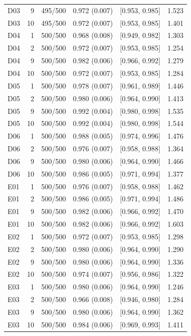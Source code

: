 \begin{longtable}[t]{lrllll}
D03 & 9 & 495/500 & 0.972 (0.007) & {}[0.953, 0.985] & 1.523\\
D03 & 10 & 495/500 & 0.972 (0.007) & {}[0.953, 0.985] & 1.401\\
D04 & 1 & 500/500 & 0.968 (0.008) & {}[0.949, 0.982] & 1.303\\
D04 & 2 & 500/500 & 0.972 (0.007) & {}[0.953, 0.985] & 1.254\\
D04 & 9 & 500/500 & 0.982 (0.006) & {}[0.966, 0.992] & 1.279\\
D04 & 10 & 500/500 & 0.972 (0.007) & {}[0.953, 0.985] & 1.284\\
D05 & 1 & 500/500 & 0.978 (0.007) & {}[0.961, 0.989] & 1.446\\
D05 & 2 & 500/500 & 0.980 (0.006) & {}[0.964, 0.990] & 1.413\\
D05 & 9 & 500/500 & 0.992 (0.004) & {}[0.980, 0.998] & 1.535\\
D05 & 10 & 500/500 & 0.992 (0.004) & {}[0.980, 0.998] & 1.544\\
D06 & 1 & 500/500 & 0.988 (0.005) & {}[0.974, 0.996] & 1.476\\
D06 & 2 & 500/500 & 0.976 (0.007) & {}[0.958, 0.988] & 1.364\\
D06 & 9 & 500/500 & 0.980 (0.006) & {}[0.964, 0.990] & 1.466\\
D06 & 10 & 500/500 & 0.986 (0.005) & {}[0.971, 0.994] & 1.377\\
E01 & 1 & 500/500 & 0.976 (0.007) & {}[0.958, 0.988] & 1.462\\
E01 & 2 & 500/500 & 0.986 (0.005) & {}[0.971, 0.994] & 1.486\\
E01 & 9 & 500/500 & 0.982 (0.006) & {}[0.966, 0.992] & 1.470\\
E01 & 10 & 500/500 & 0.982 (0.006) & {}[0.966, 0.992] & 1.603\\
E02 & 1 & 500/500 & 0.972 (0.007) & {}[0.953, 0.985] & 1.298\\
E02 & 2 & 500/500 & 0.980 (0.006) & {}[0.964, 0.990] & 1.290\\
E02 & 9 & 500/500 & 0.980 (0.006) & {}[0.964, 0.990] & 1.336\\
E02 & 10 & 500/500 & 0.974 (0.007) & {}[0.956, 0.986] & 1.322\\
E03 & 1 & 500/500 & 0.980 (0.006) & {}[0.964, 0.990] & 1.246\\
E03 & 2 & 500/500 & 0.966 (0.008) & {}[0.946, 0.980] & 1.284\\
E03 & 9 & 500/500 & 0.980 (0.006) & {}[0.964, 0.990] & 1.362\\
E03 & 10 & 500/500 & 0.984 (0.006) & {}[0.969, 0.993] & 1.411\\

\end{longtable}
